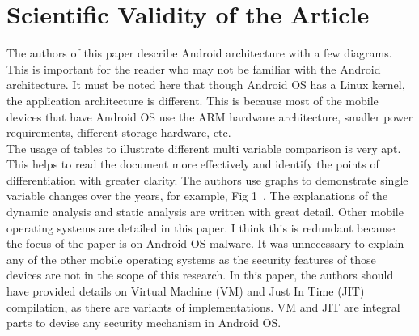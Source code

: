 \documentclass[letterpaper,10pt]{texMemo}
\begin{document}
\section*{Scientific Validity of the Article}
The authors of this paper describe Android architecture with a few diagrams. This is important for the reader who may not be familiar with the Android architecture. It must be noted here that though Android OS has a Linux kernel, the application architecture is different. This is because most of the mobile devices that have Android OS use the ARM hardware architecture, smaller power requirements, different storage hardware, etc.\\ 
        The usage of tables to illustrate different multi variable comparison is very apt. This helps to read the document more effectively and identify the points of differentiation with greater clarity. The authors use graphs to demonstrate single variable changes over the years, for example, Fig 1~\cite{Tam:2017:EAM:3022634.3017427}. The explanations of the dynamic analysis and static analysis are written with great detail. Other mobile operating systems are detailed in this paper. I think this is redundant because the focus of the paper is on Android OS malware. It was unnecessary to explain any of the other mobile operating systems as the security features of those devices are not in the scope of this research. In this paper, the authors should have provided details on Virtual Machine (VM) and Just In Time (JIT) compilation, as there are variants of implementations. VM and JIT are integral parts to devise any security mechanism in Android OS.
\end{document}
